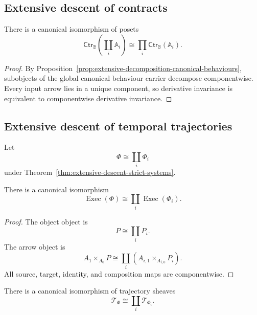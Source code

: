 \subsection{Extensive descent of contracts}
\label{subsec:extensive-descent-residual-contracts}

\begin{theorem}
\label{thm:extensive-descent-residual-contracts}
There is a canonical isomorphism of posets
\[
    \mathsf{Ctr}_{\mathbb B}
    \left(
        \coprod_i\mathbb A_i
    \right)
    \cong
    \prod_i
    \mathsf{Ctr}_{\mathbb B}(\mathbb A_i).
\]
\end{theorem}

\begin{proof}
By
Proposition~\ref{prop:extensive-decomposition-canonical-behaviours},
subobjects of the global canonical behaviour carrier decompose componentwise.
Every input arrow lies in a unique component, so derivative invariance is
equivalent to componentwise derivative invariance.
\end{proof}

\subsection{Extensive descent of temporal trajectories}
\label{subsec:extensive-descent-temporal-trajectories}

Let
\[
    \Phi
    \cong
    \coprod_i\Phi_i
\]
under
Theorem~\ref{thm:extensive-descent-strict-systems}.

\begin{proposition}
\label{prop:extensive-decomposition-execution-categories}
There is a canonical isomorphism
\[
    \operatorname{Exec}(\Phi)
    \cong
    \coprod_i
    \operatorname{Exec}(\Phi_i).
\]
\end{proposition}

\begin{proof}
The object object is
\[
    P\cong\coprod_iP_i.
\]
The arrow object is
\[
    A_1\times_{A_0}P
    \cong
    \coprod_i
    \left(
        A_{i,1}\times_{A_{i,0}}P_i
    \right).
\]
All source, target, identity, and composition maps are componentwise.
\end{proof}

\begin{corollary}
\label{cor:extensive-descent-trajectories}
There is a canonical isomorphism of trajectory sheaves
\[
    \mathscr T_\Phi
    \cong
    \coprod_i\mathscr T_{\Phi_i}.
\]
\end{corollary}

